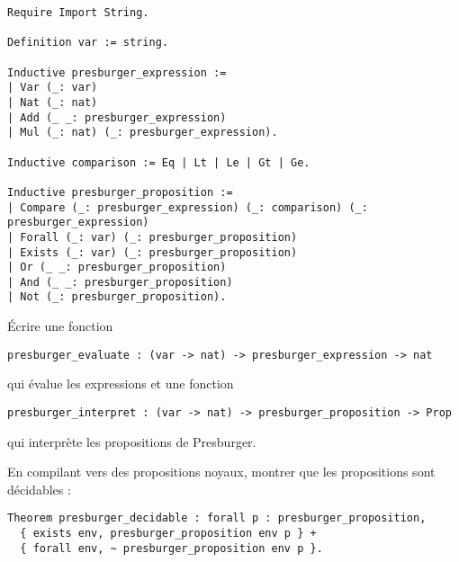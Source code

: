 \documentclass{article}
\begin{document}
\begin{verbatim}
Require Import String.

Definition var := string.

Inductive presburger_expression :=
| Var (_: var)
| Nat (_: nat)
| Add (_ _: presburger_expression)
| Mul (_: nat) (_: presburger_expression).

Inductive comparison := Eq | Lt | Le | Gt | Ge.

Inductive presburger_proposition :=
| Compare (_: presburger_expression) (_: comparison) (_: presburger_expression)
| Forall (_: var) (_: presburger_proposition)
| Exists (_: var) (_: presburger_proposition)
| Or (_ _: presburger_proposition)
| And (_ _: presburger_proposition)
| Not (_: presburger_proposition).
\end{verbatim}

Écrire une fonction
\begin{verbatim}
presburger_evaluate : (var -> nat) -> presburger_expression -> nat
\end{verbatim}
qui évalue les expressions et une fonction
\begin{verbatim}
presburger_interpret : (var -> nat) -> presburger_proposition -> Prop
\end{verbatim}
qui interprète les propositions de Presburger.

En compilant vers des propositions noyaux,
montrer que les propositions sont décidables :

\begin{verbatim}
Theorem presburger_decidable : forall p : presburger_proposition,
  { exists env, presburger_proposition env p } +
  { forall env, ~ presburger_proposition env p }.
\end{verbatim}
\end{document}
